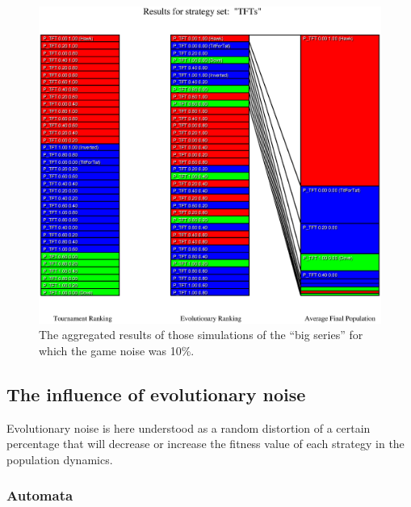 \begin{figure}
\begin{center}
\includegraphics[width=20cm]{tables/TFTs_G0.100.eps}
\caption{\label{TFTs_G0100} The aggregated results of those
simulations of the ``big series'' for which the game noise was 10\%.}
\end{center}
\end{figure}


\newpage
\subsection{The influence of evolutionary noise}

Evolutionary noise is here understood as a
random distortion of a certain percentage that will decrease or increase the
fitness value of each strategy in the population dynamics.

\subsubsection{Automata}
\begin{small}

\end{small}

